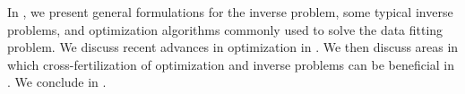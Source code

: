 In , we present general formulations for the inverse
problem, some typical inverse problems, and optimization algorithms commonly
used to solve the data fitting problem.
We discuss recent advances in optimization in .
We then discuss areas in which cross-fertilization of optimization and inverse
problems can be beneficial in .
We conclude in .
